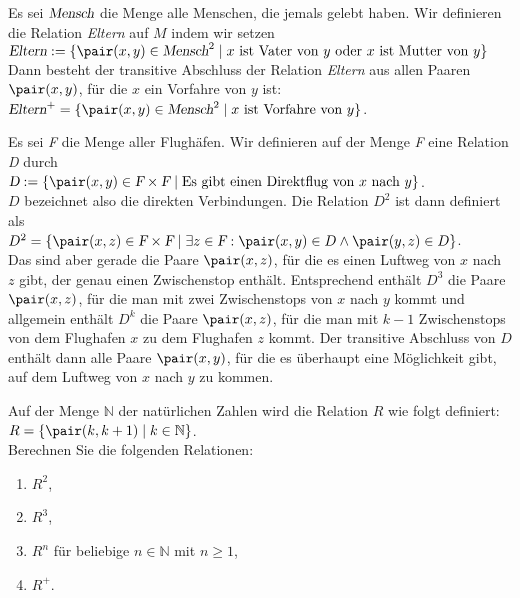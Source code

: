 \example
Es sei $\textsl{Mensch}$ die Menge alle Menschen, die jemals gelebt haben.  Wir definieren
die Relation \textsl{Eltern} auf $M$ indem wir setzen
\\[0.2cm]
\hspace*{1.3cm}
$\textsl{Eltern} := \{ \pair(x,y) \in \textsl{Mensch}^2 \mid \mbox{$x$ ist Vater von $y$ oder 
                                                                   $x$ ist Mutter von $y$} \}$
\\[0.2cm]
Dann besteht der transitive Abschluss der Relation \textsl{Eltern} aus allen Paaren
$\pair(x,y)$, f\"{u}r die $x$ ein Vorfahre von $y$ ist:
\\[0.2cm]
\hspace*{1.3cm}
$\textsl{Eltern}^+ = \{ \pair(x,y) \in \textsl{Mensch}^2 \mid \mbox{$x$ ist Vorfahre von $y$} \}$.
\next

\example
Es sei \textsl{F} die Menge aller Flugh\"{a}fen.  Wir definieren auf der Menge \textsl{F} eine
Relation \textsl{D} durch
\\[0.2cm]
\hspace*{1.3cm}
$\textsl{D} := \{ \pair(x,y) \in \textsl{F} \times \textsl{F} \mid
                  \mbox{Es gibt einen Direktflug von $x$ nach $y$} \}$.
\\[0.2cm]
$D$ bezeichnet also die direkten Verbindungen.  Die Relation $D^2$ ist dann definiert als
\\[0.2cm]
\hspace*{1.3cm}
$D^2 = \{ \pair(x,z) \in \textsl{F} \times \textsl{F} \mid 
          \exists z \in \textsl{F}: \pair(x,y) \in D \wedge \pair(y,z) \in D \}$.
\\[0.2cm]
Das sind aber gerade die Paare $\pair(x,z)$, f\"{u}r die es einen Luftweg von $x$ nach $z$
gibt, der genau einen Zwischenstop enth\"{a}lt.  Entsprechend enth\"{a}lt $D^3$ die Paare
$\pair(x,z)$, f\"{u}r die man mit zwei Zwischenstops von $x$ nach $y$ kommt und allgemein
enth\"{a}lt $D^k$ die Paare $\pair(x,z)$, f\"{u}r die man mit $k-1$ Zwischenstops von dem
Flughafen $x$ zu dem Flughafen $z$ kommt.
Der transitive Abschluss von $D$ enth\"{a}lt
dann alle Paare $\pair(x,y)$, f\"{u}r die es \"{u}berhaupt eine M\"{o}glichkeit gibt, auf dem Luftweg
von $x$ nach $y$ zu kommen.

\exercise
Auf der Menge $\mathbb{N}$ der nat\"{u}rlichen Zahlen wird die Relation $R$ wie folgt definiert:
\\[0.2cm]
\hspace*{1.3cm}
$R = \{ \pair(k, k + 1) \mid k \in \mathbb{N} \}$.
\\[0.2cm]
Berechnen Sie die folgenden Relationen:
\begin{enumerate}
\item $R^2$,
\item $R^3$,
\item $R^n$ f\"{u}r beliebige $n \in \mathbb{N}$ mit $n \geq 1$,
\item $R^+$.
\end{enumerate}


